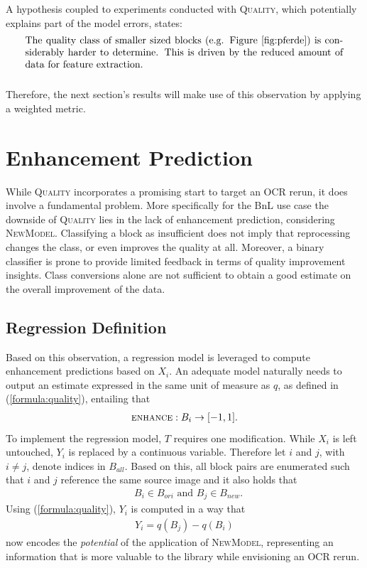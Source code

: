 \documentclass{jdmdh}
\begin{document}
\noindent
A hypothesis coupled to experiments conducted with \textsc{Quality}, which potentially explains part of the model errors, states: \\
\begin{align} \label{equation:hypothesis}
    \parbox{32em}{The quality class of smaller sized blocks (e.g. Figure~\ref{fig:pferde}) is considerably harder to determine. This is driven by the reduced amount of data for feature extraction.}
\end{align}
\\
Therefore, the next section's results will make use of this observation by applying a weighted metric.
\section{Enhancement Prediction} \label{section:enhance}
While \textsc{Quality} incorporates a promising start to target an OCR rerun, it does involve a fundamental problem. More specifically for the BnL use case the downside of \textsc{Quality} lies in the lack of enhancement prediction, considering \textsc{NewModel}. Classifying a block as insufficient does not imply that reprocessing changes the class, or even improves the quality at all. Moreover, a binary classifier is prone to provide limited feedback in terms of quality improvement insights. Class conversions alone are not sufficient to obtain a good estimate on the overall improvement of the data.
\subsection{Regression Definition}
Based on this observation, a regression model is leveraged to compute enhancement predictions based on $X_i$. An adequate model naturally needs to output an estimate expressed in the same unit of measure as $q$, as defined in (\ref{formula:quality}), entailing that
\begin{align}
    \textsc{enhance}: B_i \rightarrow [-1,1].
\end{align}
To implement the regression model, $T$ requires one modification. While $X_i$ is left untouched, $Y_i$ is replaced by a continuous variable. Therefore let $i$ and $j$, with $i\!\neq\!j$, denote indices in $B_{all}$. Based on this, all block pairs are enumerated such that $i$ and $j$ reference the same source image and it also holds that
\begin{align}
    &B_i\in B_{ori}\text{ and }B_j\in B_{new}.
\end{align}
Using (\ref{formula:quality}), $Y_i$ is computed in a way that
\begin{align}
    Y_i = q(B_j)-q(B_i)
\end{align}
now encodes the \textit{potential} of the application of \textsc{NewModel}, representing an information that is more valuable to the library while envisioning an OCR rerun.
\end{document}
